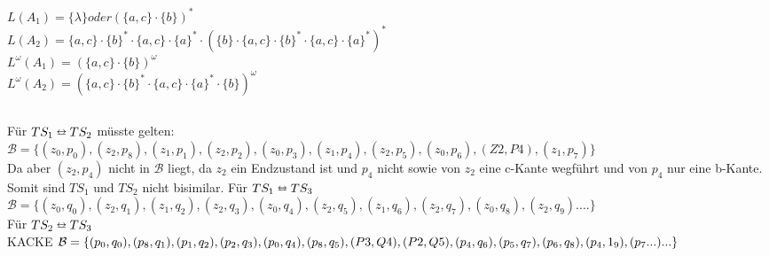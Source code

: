 \documentclass[a4paper,12pt]{scrartcl}
\title{\blatt}
\date{Gruppe 06}
\author{Sabrina Buczko 6663234, Julian Deinert 6535880, Rafael Heid 6704828}
\begin{document}
\maketitle
\newpage
\setcounter{section}{2}
\section{}
\setcounter{subsection}{2}
\subsection{}
\subsubsection{}
$L(A_1)=\{\lambda\} oder (\{a,c\}\cdot\{b\})^*$\\
$L(A_2)=\{a,c\}\cdot\{b\}^* \cdot \{a,c\}\cdot \{a\}^* \cdot(\{b\}\cdot \{a,c\}\cdot\{b\}^* \cdot \{a,c\}\cdot \{a\}^*)^*$\\
$L^\omega (A_1)=(\{a,c\}\cdot\{b\})^\omega$\\
$L^\omega (A_2)=(\{a,c\}\cdot\{b\}^* \cdot \{a,c\}\cdot \{a\}^* \cdot\{b\})^\omega$

\subsubsection{}

\subsubsection{}

\subsection{}
\subsubsection{}
Für $TS_1 \leftrightarroweq TS_2$ müsste gelten:\\
$\mathcal{B} = \{(z_0,p_0),(z_2,p_8),(z_1,p_1),(z_2,p_2),(z_0,p_3),(z_1,p_4),(z_2,p_5),(z_0,p_6),(Z2,P4),(z_1,p_7)\}$\\
Da aber $(z_2,p_4)$ nicht in $\mathcal{B}$ liegt, da $z_2$ ein Endzustand ist und $p_4$ nicht sowie von $z_2$ eine c-Kante wegführt und von $p_4$ nur eine b-Kante. Somit sind $TS_1$ und $TS_2$ nicht bisimilar.
Für $TS_1 \leftrightarroweq TS_3$\\
$\mathcal{B} = \{(z_0,q_0),(z_2,q_1),(z_1,q_2),(z_2,q_3),(z_0,q_4),(z_2,q_5),(z_1,q_6),(z_2,q_7),(z_0,q_8),(z_2,q_9)....\}$\\
Für $TS_2 \leftrightarroweq TS_3$\\KACKE
$\mathcal{B} = \{(p_0,q_0),(p_8,q_1),(p_1,q_2),(p_2,q_3),(p_0,q_4),(p_8,q_5),(P3,Q4),(P2,Q5),(p_4,q_6)\\,(p_5,q_7),(p_6,q_8),(p_4,1_9),(p_7...)...\}$\\
\end{document}
